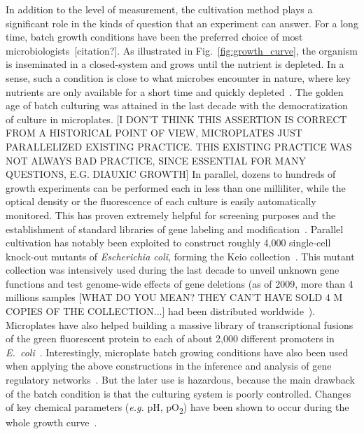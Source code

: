 In addition to the level of measurement, the cultivation method plays a significant role in the kinds of question that an experiment can answer.
For a long time, batch growth conditions have been the preferred choice of most microbiologists~[citation?].
As illustrated in Fig.~\ref{fig:growth_curve}, the organism is inseminated in a closed-system and grows until the nutrient is depleted.
In a sense, such a condition is close to what microbes encounter in nature, where key nutrients are only available for a short time and quickly depleted~\cite{mcarthur_microbial_2006,menge_nitrogen_2012,hobbie_microbes_2013}.
The golden age of batch culturing was attained in the last decade with the democratization of culture in microplates. [I DON'T THINK THIS ASSERTION IS CORRECT FROM A HISTORICAL POINT OF VIEW, MICROPLATES JUST PARALLELIZED EXISTING PRACTICE. THIS EXISTING PRACTICE WAS NOT ALWAYS BAD PRACTICE, SINCE ESSENTIAL FOR MANY QUESTIONS, E.G. DIAUXIC GROWTH]
In parallel, dozens to hundreds of growth experiments can be performed each in less than one milliliter, while the optical density or the fluorescence of each culture is easily automatically monitored.
This has proven extremely helpful for screening purposes and the establishment of standard libraries of gene labeling and modification~\cite{baba_construction_2006,zaslaver_comprehensive_2006}.
Parallel cultivation has notably been exploited to construct roughly 4,000 single-cell knock-out mutants of \textit{Escherichia coli}, forming the Keio collection~\cite{baba_construction_2006}.
This mutant collection was intensively used during the last decade to unveil unknown gene functions and test genome-wide effects of gene deletions (as of 2009, more than 4 millions samples [WHAT DO YOU MEAN? THEY CAN'T HAVE SOLD 4 M COPIES OF THE COLLECTION...] had been distributed worldwide~\cite{yamamoto_update_2009}).
Microplates have also helped building a massive library of transcriptional fusions of the green fluorescent protein to each of about 2,000 different promoters in \textit{E.~coli}~\cite{zaslaver_comprehensive_2006}.
Interestingly, microplate batch growing conditions have also been used when applying the above constructions in the inference and analysis of gene regulatory networks~\cite{gerosa_dissecting_2013,berthoumieux_shared_2013,keren_promoters_2013,
ronen_assigning_2002,stefan_inference_2015}.
But the later use is hazardous, because the main drawback of the batch condition is that the culturing system is poorly controlled.
Changes of key chemical parameters (\textit{e.g.} pH, pO\textsubscript{2}) have been shown to occur during the whole growth curve~\cite{bekker_changes_2007}. 
